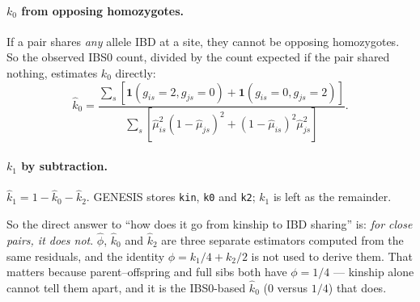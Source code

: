 \documentclass[10pt,a4paper]{article}
\begin{document}
\paragraph{$k_0$ from opposing homozygotes.} If a pair shares \emph{any} allele IBD at a site, they cannot be
opposing homozygotes. So the observed IBS0 count, divided by the count expected if the pair shared nothing,
estimates $k_0$ directly:
\begin{equation*}
\hat k_0=\frac{\sum_s \left[\mathbf{1}(g_{is}{=}2,g_{js}{=}0)+\mathbf{1}(g_{is}{=}0,g_{js}{=}2)\right]}
{\sum_s \left[\hat\mu_{is}^{2}(1-\hat\mu_{js})^{2}+(1-\hat\mu_{is})^{2}\hat\mu_{js}^{2}\right]}.
\end{equation*}

\paragraph{$k_1$ by subtraction.} $\hat k_1 = 1-\hat k_0-\hat k_2$. GENESIS stores \texttt{kin}, \texttt{k0}
and \texttt{k2}; $k_1$ is left as the remainder.

\medskip
\noindent
So the direct answer to ``how does it go from kinship to IBD sharing'' is: \emph{for close pairs, it does
not}. $\hat\phi$, $\hat k_0$ and $\hat k_2$ are three separate estimators computed from the same residuals,
and the identity $\phi=k_1/4+k_2/2$ is not used to derive them. That matters because parent--offspring and
full sibs both have $\phi=1/4$ --- kinship alone cannot tell them apart, and it is the IBS0-based $\hat k_0$
($0$ versus $1/4$) that does.
\end{document}

